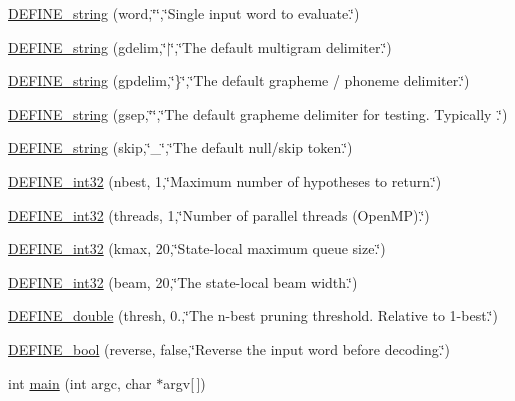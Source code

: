 \begin{DoxyCompactItemize}
\item 
\hyperlink{phonetisaurus-g2prnn_8cc_a1a79fbeb46e8d58fc6589433af277428}{D\+E\+F\+I\+N\+E\+\_\+string} (word,\char`\"{}\char`\"{},\char`\"{}Single input word to evaluate.\char`\"{})
\item 
\hyperlink{phonetisaurus-g2prnn_8cc_a74fff5c2a9beb815a6bd1f5a330520bb}{D\+E\+F\+I\+N\+E\+\_\+string} (gdelim,\char`\"{}$\vert$\char`\"{},\char`\"{}The default multigram delimiter.\char`\"{})
\item 
\hyperlink{phonetisaurus-g2prnn_8cc_ab1f6e3b5a5387f2651c2abb5c65f39db}{D\+E\+F\+I\+N\+E\+\_\+string} (gpdelim,\char`\"{}\}\char`\"{},\char`\"{}The default grapheme / phoneme delimiter.\char`\"{})
\item 
\hyperlink{phonetisaurus-g2prnn_8cc_ab2cc4d61bb4340ded7b8c8cce8ef2998}{D\+E\+F\+I\+N\+E\+\_\+string} (gsep,\char`\"{}\char`\"{},\char`\"{}The default grapheme delimiter for testing.  Typically \textquotesingle{}\textquotesingle{}.\char`\"{})
\item 
\hyperlink{phonetisaurus-g2prnn_8cc_a712966f3cc546a90beaf0ff6d307df76}{D\+E\+F\+I\+N\+E\+\_\+string} (skip,\char`\"{}\+\_\+\char`\"{},\char`\"{}The default null/skip token.\char`\"{})
\item 
\hyperlink{phonetisaurus-g2prnn_8cc_a8ce5665997cc9fdf474932437140b4f9}{D\+E\+F\+I\+N\+E\+\_\+int32} (nbest, 1,\char`\"{}Maximum number of hypotheses to return.\char`\"{})
\item 
\hyperlink{phonetisaurus-g2prnn_8cc_a78f0c9344cdc475aeff6a7b00d89e5c1}{D\+E\+F\+I\+N\+E\+\_\+int32} (threads, 1,\char`\"{}Number of parallel threads (Open\+MP).\char`\"{})
\item 
\hyperlink{phonetisaurus-g2prnn_8cc_a0feacf2109e0b1e83f06240d0354ff4e}{D\+E\+F\+I\+N\+E\+\_\+int32} (kmax, 20,\char`\"{}State-\/local maximum queue size.\char`\"{})
\item 
\hyperlink{phonetisaurus-g2prnn_8cc_a39fd8f0112b58d6c13e35329686c90af}{D\+E\+F\+I\+N\+E\+\_\+int32} (beam, 20,\char`\"{}The state-\/local beam width.\char`\"{})
\item 
\hyperlink{phonetisaurus-g2prnn_8cc_a51ab0545bb2214c70c3bc4b8958b2500}{D\+E\+F\+I\+N\+E\+\_\+double} (thresh, 0.,\char`\"{}The n-\/best pruning threshold. Relative to 1-\/best.\char`\"{})
\item 
\hyperlink{phonetisaurus-g2prnn_8cc_ab4cc7f74640b5741f665bb09c9d3f9a7}{D\+E\+F\+I\+N\+E\+\_\+bool} (reverse, false,\char`\"{}Reverse the input word before decoding.\char`\"{})
\item 
int \hyperlink{phonetisaurus-g2prnn_8cc_a0ddf1224851353fc92bfbff6f499fa97}{main} (int argc, char $\ast$argv\mbox{[}$\,$\mbox{]})
\end{DoxyCompactItemize}


